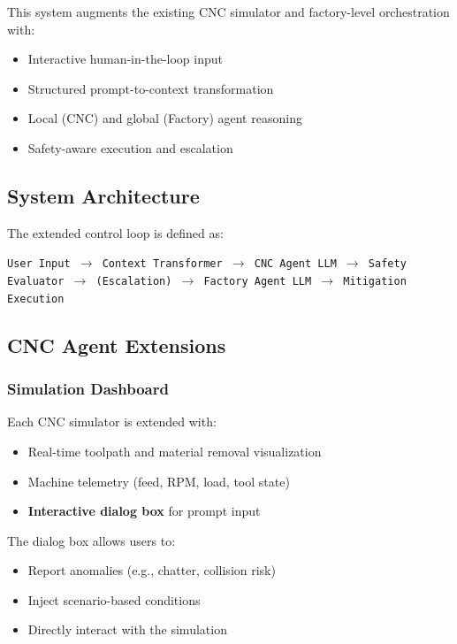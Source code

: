 \documentclass{article}
\begin{document}
This system augments the existing CNC simulator and factory-level orchestration with:
\begin{itemize}
    \item Interactive human-in-the-loop input
    \item Structured prompt-to-context transformation
    \item Local (CNC) and global (Factory) agent reasoning
    \item Safety-aware execution and escalation
\end{itemize}

\subsection{System Architecture}

The extended control loop is defined as:

\begin{center}
\texttt{User Input $\rightarrow$ Context Transformer $\rightarrow$ CNC Agent LLM $\rightarrow$ Safety Evaluator $\rightarrow$ (Escalation) $\rightarrow$ Factory Agent LLM $\rightarrow$ Mitigation Execution}
\end{center}

\subsection{CNC Agent Extensions}

\subsubsection{Simulation Dashboard}
Each CNC simulator is extended with:
\begin{itemize}
    \item Real-time toolpath and material removal visualization
    \item Machine telemetry (feed, RPM, load, tool state)
    \item \textbf{Interactive dialog box} for prompt input
\end{itemize}

The dialog box allows users to:
\begin{itemize}
    \item Report anomalies (e.g., chatter, collision risk)
    \item Inject scenario-based conditions
    \item Directly interact with the simulation
\end{itemize}
\end{document}

